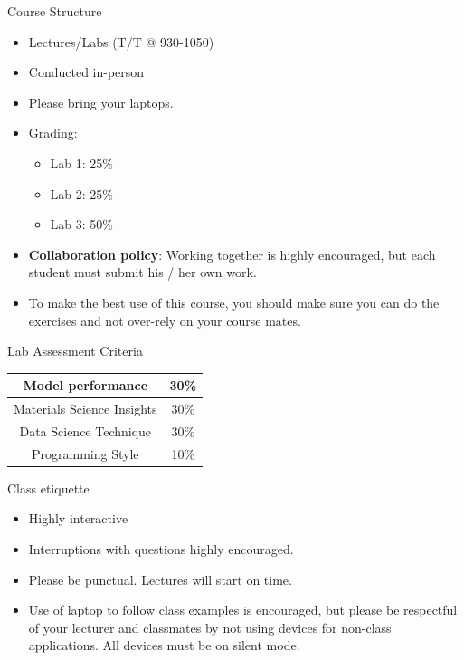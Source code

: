 \documentclass[aspectratio=169]{beamer}
\begin{document}
\begin{frame}
\begin{columns}
\begin{figure}
\end{figure}
\end{columns}
\end{frame}


\begin{frame}{Course Structure}
    \begin{itemize}
        \item Lectures/Labs (T/T @ 930-1050)
        \item Conducted in-person
        \item Please bring your laptops.
        \item Grading:
        \begin{itemize}
            \item Lab 1: 25\%
            \item Lab 2: 25\%
            \item Lab 3: 50\%
        \end{itemize}
        \item \textbf{Collaboration policy}:  Working together is highly encouraged, but each student must submit his / her own work. 
        \item To make the best use of this course, you should make sure you can do the exercises and not over-rely on your course mates.
    \end{itemize}
\end{frame}


\begin{frame}{Lab Assessment Criteria}
\begin{table}[]
    \centering
    \begin{tabular}{|c|c|}
    \hline
Model performance & 30\%\\
\hline
Materials Science Insights & 30\%\\
\hline
Data Science Technique & 30\%\\
\hline
Programming Style & 10\%\\
\hline
    \end{tabular}
\end{table}
\end{frame}


\begin{frame}{Class etiquette}
    \begin{itemize}
        \item Highly interactive
        \item Interruptions with questions highly encouraged.
        \item Please be punctual. Lectures will start on time.
        \item Use of laptop to follow class examples is encouraged, but please be respectful of your lecturer and classmates by not using devices for non-class applications.  All devices must be on silent mode.
    \end{itemize}
\end{frame}
\end{document}
